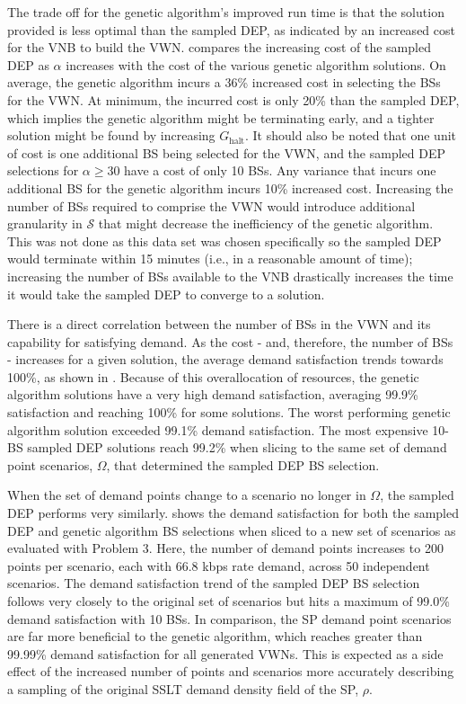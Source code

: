 \documentclass[12pt,dvipsnames]{report}
\begin{document}
The trade off for the genetic algorithm's improved run time is that the solution provided is less optimal than the sampled DEP, as indicated by an increased cost for the VNB to build the VWN.   compares the increasing cost of the sampled DEP as $\alpha$ increases with the cost of the various genetic algorithm solutions.  On average, the genetic algorithm incurs a 36\% increased cost in selecting the BSs for the VWN.  At minimum, the incurred cost is only 20\% than the sampled DEP, which implies the genetic algorithm might be terminating early, and a tighter solution might be found by increasing $G_\text{halt}$.  It should also be noted that one unit of cost is one additional BS being selected for the VWN, and the sampled DEP selections for $\alpha \geq 30$ have a cost of only 10 BSs.  Any variance that incurs one additional BS for the genetic algorithm incurs 10\% increased cost.  Increasing the number of BSs required to comprise the VWN would introduce additional granularity in $\mathcal{S}$ that might decrease the inefficiency of the genetic algorithm.  This was not done as this data set was chosen specifically so the sampled DEP would terminate within 15 minutes (i.e., in a reasonable amount of time); increasing the number of BSs available to the VNB drastically increases the time it would take the sampled DEP to converge to a solution.

There is a direct correlation between the number of BSs in the VWN and its capability for satisfying demand.  As the cost - and, therefore, the number of BSs - increases for a given solution, the average demand satisfaction trends towards 100\%, as shown in .  Because of this overallocation of resources, the genetic algorithm solutions have a very high demand satisfaction, averaging 99.9\% satisfaction and reaching 100\% for some solutions.  The worst performing genetic algorithm solution exceeded 99.1\% demand satisfaction.  The most expensive 10-BS sampled DEP solutions reach 99.2\% when slicing to the same set of demand point scenarios, $\Omega$, that determined the sampled DEP BS selection.

When the set of demand points change to a scenario no longer in $\Omega$, the sampled DEP performs very similarly.   shows the demand satisfaction for both the sampled DEP and genetic algorithm BS selections when sliced to a new set of scenarios as evaluated with Problem 3.  Here, the number of demand points increases to 200 points per scenario, each with 66.8 kbps rate demand, across 50 independent scenarios.  The demand satisfaction trend of the sampled DEP BS selection follows very closely to the original set of scenarios but hits a maximum of 99.0\% demand satisfaction with 10 BSs.  In comparison, the SP demand point scenarios are far more beneficial to the genetic algorithm, which reaches greater than 99.99\% demand satisfaction for all generated VWNs.  This is expected as a side effect of the increased number of points and scenarios more accurately describing a sampling of the original SSLT demand density field of the SP, $\rho$.
\end{document}
